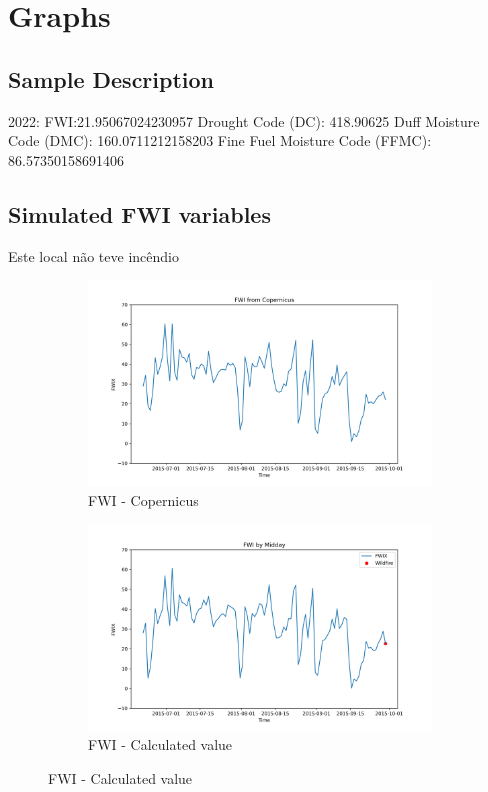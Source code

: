 \chapter{Graphs}
\label{sec:graphs}

\section{Sample Description}
2022:
FWI:21.95067024230957
Drought Code (DC):  418.90625
Duff Moisture Code (DMC):  160.0711212158203
Fine Fuel Moisture Code (FFMC):  86.57350158691406

\section{Simulated FWI variables}
Este local não teve incêndio
\begin{figure}[h]
\caption{Comparison of FWI calculated values and Copernicus}
    \centering
    \begin{subfigure}{0.49\textwidth}
        \centering
        \includegraphics[width=\textwidth]{graphs/2015MesmoSitio/2015CopernicusFWI12.png}
        \caption{FWI - Copernicus}
        \label{fig:fwi_copernicus_2015_semfogo}
    \end{subfigure}
    \hfill
    \begin{subfigure}{0.49\textwidth}
        \centering
        \includegraphics[width=\textwidth]{graphs/2015MesmoSitio/2015CalcFWI12.png}
        \caption{FWI - Calculated value}
        \label{fig:fwi_calculated_2015_semfogo}
    \end{subfigure}
    \label{fig:comparison_semfogo_copernicus_calculated}
\end{figure}


